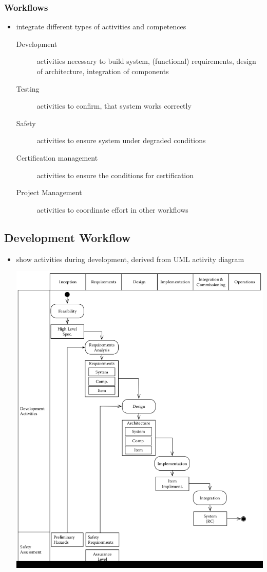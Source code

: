 \documentclass[a4paper, 10pt]{article}
\begin{document}
\subsubsection*{Workflows}
\begin{itemize}
    \item integrate different types of activities and competences
    \begin{description}
        \item[Development] activities necessary to build system, (functional) requirements, design of architecture, integration of components
        \item[Testing] activities to confirm, that system works correctly
        \item[Safety] activities to ensure system under degraded conditions
        \item[Certification management] activities to ensure the conditions for certification
        \item[Project Management] activities to coordinate effort in other workflows
    \end{description}
\end{itemize}

\subsection*{Development Workflow}
\begin{itemize}
    \item show activities during development, derived from UML activity diagram
    \begin{center}
    \includegraphics[width=\linewidth]{images/genDevFlow}
    \end{center}
\end{itemize}
\end{document}
